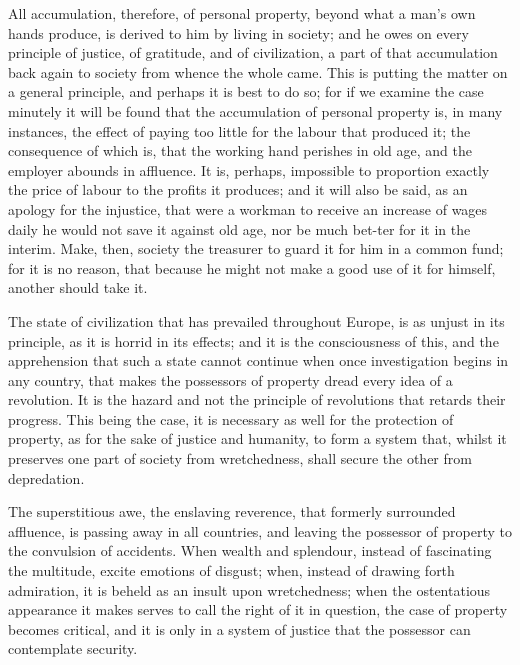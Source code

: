 All accumulation, therefore, of personal property, beyond what a man’s own hands produce, is derived to him by living in society; and he owes on every principle of justice, of gratitude, and of civilization, a part of that accumulation back again to society from whence the whole came. This is putting the matter on a general principle, and perhaps it is best to do so; for if we examine the case minutely it will be found that the accumulation of personal property is, in many instances, the effect of paying too little for the labour that produced it; the consequence of which is, that the working hand perishes in old age, and the employer abounds in affluence. It is, perhaps, impossible to proportion exactly the price of labour to the profits it produces; and it will also be said, as an apology for the injustice, that were a workman to receive an increase of wages daily he would not save it against old age, nor be much bet-ter for it in the interim. Make, then, society the treasurer to guard it for him in a common fund; for it is no reason, that because he might not make a good use of it for himself, another should take it.\par

The state of civilization that has prevailed throughout Europe, is as unjust in its principle, as it is horrid in its effects; and it is the consciousness of this, and the apprehension that such a state cannot continue when once investigation begins in any country, that makes the possessors of property dread every idea of a revolution. It is the hazard and not the principle of revolutions that retards their progress. This being the case, it is necessary as well for the protection of property, as for the sake of justice and humanity, to form a system that, whilst it preserves one part of society from wretchedness, shall secure the other from depredation.\par

The superstitious awe, the enslaving reverence, that formerly surrounded affluence, is passing away in all countries, and leaving the possessor of property to the convulsion of accidents. When wealth and splendour, instead of fascinating the multitude, excite emotions of disgust; when, instead of drawing forth admiration, it is beheld as an insult upon wretchedness; when the ostentatious appearance it makes serves to call the right of it in question, the case of property becomes critical, and it is only in a system of justice that the possessor can contemplate security.\par

